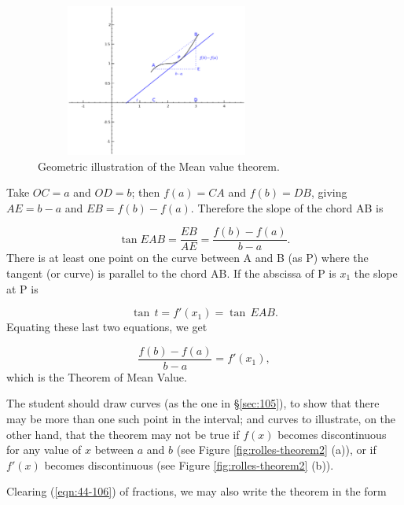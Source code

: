 \begin{figure}[h!]
\begin{minipage}{\textwidth}
\begin{center}
\includegraphics[height=5cm,width=8cm]{mean-value2.eps}
\end{center}
\end{minipage}
\caption{Geometric illustration of the Mean value theorem.}
\label{fig:mean-value}
\end{figure}

Take $OC = a$ and $OD = b$; then $f(a) = CA$ and $f(b) = DB$, giving 
$AE = b - a$ and $EB = f(b) - f(a)$.
Therefore the slope of the chord AB is

\[
\tan EAB = \frac{EB}{AE} = \frac{f(b) - f(a)}{b - a}.
\]
There is at least one point on the curve between A and B (as P) 
where the tangent (or curve) is parallel to the chord AB. 
If the abscissa of P is $x_1$ the slope at P is

\[
\tan\, t = f'(x_1) = \tan\, EAB.
\]
Equating these last two equations, %
we get

\[  	
\frac{f(b) - f(a)}{b - a} = f'(x_1),
\]
which is the Theorem of Mean Value.

The student should draw curves (as the one in \S \ref{sec:105}), 
to show that there may be more than one such point in the 
interval; and curves to illustrate, on the other hand, 
that the theorem may not be true if $f(x)$ becomes discontinuous 
for any value of $x$ between $a$ and $b$ 
(see Figure \ref{fig:rolles-theorem2} (a)), %
or if $f'(x)$ becomes discontinuous 
(see Figure \ref{fig:rolles-theorem2} (b)). %

Clearing (\ref{eqn:44-106}) of fractions, we may also write 
the theorem in the form

